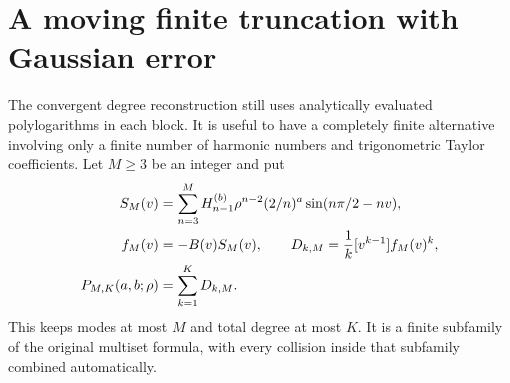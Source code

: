 \section{A moving finite truncation with Gaussian error}
\label{ang:sec:moving}

The convergent degree reconstruction still uses analytically evaluated
polylogarithms in each block. It is useful to have a completely finite
alternative involving only a finite number of harmonic numbers and
trigonometric Taylor coefficients. Let $M\ge3$ be an integer and put
\begin{align}
 S_M(v)&=\sum_{n=3}^M H_{n-1}^{(b)}\rho^{n-2}(2/n)^a
                         \sin(n\pi/2-nv),\notag\\
 f_M(v)&=-B(v)S_M(v),\qquad
 D_{k,M}=\frac1k[v^{k-1}]f_M(v)^k,\notag\\
 P_{M,K}(a,b;\rho)&=\sum_{k=1}^K D_{k,M}.
 \label{ang:eq:finite-cutoff}
\end{align}
This keeps modes at most $M$ and total degree at most $K$. It is
a finite subfamily of the original multiset formula, with every
collision inside that subfamily combined automatically.

